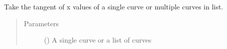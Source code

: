 \documentclass[letterpaper,10pt,english]{sphinxmanual}
\begin{document}
\begin{fulllineitems}
\label{\detokenize{pydv:pydvpy.tanx}}
Take the tangent of x values of a single curve or multiple curves in list.

\begin{sphinxVerbatim}[commandchars=\\\{\}]
  
\end{sphinxVerbatim}

\begin{sphinxVerbatim}[commandchars=\\\{\}]
\end{sphinxVerbatim}
\begin{quote}\begin{description}
\item[{Parameters}] \leavevmode
{} () \textendash{} A single curve or a list of curves

\end{description}\end{quote}

\end{fulllineitems}

\end{document}
